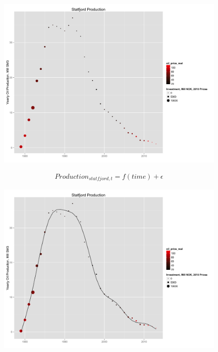 \documentclass{beamer}
\begin{document}
\begin{frame}[plain]
	\begin{figure}
	\includegraphics[width=1\textwidth]{statfjord_plot.png}
	\end{figure}
\end{frame}


\begin{frame}[plain]
	\begin{multline}
	\nonumber Production_{statfjord,t}=f(time) + \epsilon
	\end{multline}
\end{frame}


\begin{frame}[plain]
	\begin{figure}
	\includegraphics[width=1\textwidth]{statfjord_gam.png}
	\end{figure}
\end{frame}
\end{document}

